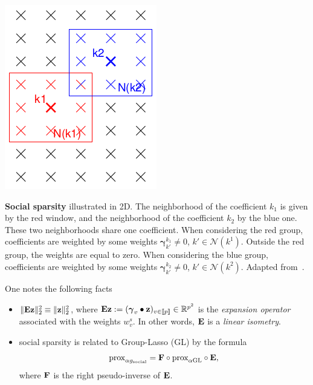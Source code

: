 \begin{marginfigure}
  \includegraphics[width=\linewidth]{figures/social.png}
  \caption{\textbf{Social sparsity} illustrated in 2D. The neighborhood of the coefficient $k_1$ is given by the red
    window, and the neighborhood of the coefficient $k_2$ by the blue one. These
    two neighborhoods share one coefficient. When considering the red group,
    coefficients are weighted by some weights $\boldsymbol{\gamma}_{k'}^{k_1} \ne 0$, $k' \in \mathcal N(k^1)$.
    Outside the red group, the weights are equal to zero. When considering the blue group,
    coefficients are weighted by some weights $\boldsymbol{\gamma}_{k'}^{k_2} \ne 0$, $k' \in \mathcal N(k^2)$.
    Adapted from~\citep{kowalski2013social}.
  }
  \label{fig:social}
\end{marginfigure}
%
One notes the following facts
\begin{itemize}
\item $\|\mathbf{E}\mathbf{z}\|^2_2 \equiv \|\mathbf{z}\|^2_2$, where $\mathbf{E}\mathbf{z} := (\boldsymbol{\gamma}_v \bullet \mathbf{z})_{v \in [\![p]\!]} \in \mathbb R^{p^2}$
  is the \textit{expansion operator} associated with the weights $w^s_v$. In other words, $\mathbf{E}$ is a \textit{linear isometry}.
\item social sparsity is related to Group-Lasso (GL) by the formula
  \begin{equation}
    \text{prox}_{\alpha g_{\text{social}}} = \mathbf{F} \circ \text{prox}_{\alpha \text{GL}} \circ \mathbf{E},
  \end{equation}
  where $\mathbf{F}$ is the right pseudo-inverse of $\mathbf{E}$.
\end{itemize}

